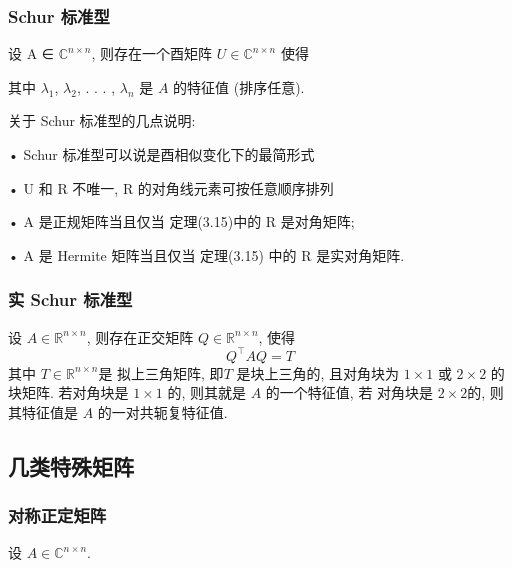 \documentclass[12pt,a4paper]{article}
\begin{document}
\newpage
\subsubsection{Schur 标准型}
\begin{framed}
	\begin{theorem}
		设 A ∈ $\mathbb{C}^{n×n}$, 则存在一个酉矩阵 $U ∈\mathbb{C}^{n×n}$ 使得	
	
	其中 $\lambda_1$, $\lambda_2$, . . . , $\lambda_n$ 是 $A$ 的特征值 (排序任意).
	\end{theorem}
\end{framed}

关于 Schur 标准型的几点说明:

• Schur 标准型可以说是酉相似变化下的最简形式

• U 和 R 不唯一, R 的对角线元素可按任意顺序排列

• A 是正规矩阵当且仅当 定理(3.15)中的 R 是对角矩阵;

• A 是 Hermite 矩阵当且仅当 定理(3.15) 中的 R 是实对角矩阵.

\subsubsection{实 Schur 标准型}
\begin{framed}
	\begin{theorem}
		设 $A ∈ \mathbb{R}^{n×n}$, 则存在正交矩阵 $Q ∈ \mathbb{R}^{n×n}$, 使得
		$$
		Q^{\top} A Q=T
		$$
		其中 $T ∈ \mathbb{R}^{n×n}$是 拟上三角矩阵, 即$ T$ 是块上三角的, 且对角块为 $1 × 1$
		或 $2 × 2$ 的块矩阵. 若对角块是 $1 × 1$ 的, 则其就是 $A$ 的一个特征值, 若
		对角块是 $2 × 2 $的, 则其特征值是 $A$ 的一对共轭复特征值.
	\end{theorem}
\end{framed}

\subsection{几类特殊矩阵}

\subsubsection{对称正定矩阵}
设 $A ∈ \mathbb{C}^{n×n}$.
\end{document}

